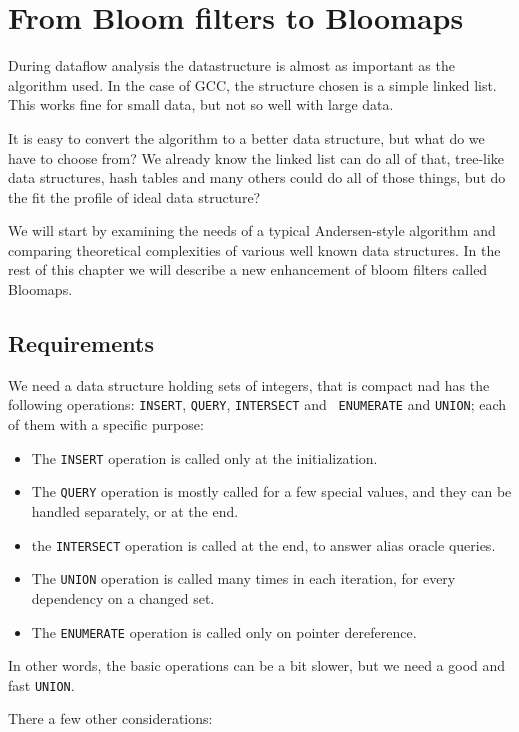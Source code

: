 \chapter{From Bloom filters to Bloomaps}

During dataflow analysis the datastructure is almost as important as the
algorithm used. In the case of GCC, the structure chosen is a simple linked
list. This works fine for small data, but not so well with large data.

It is easy to convert the algorithm to a better data structure, but what do we
have to choose from? We already know the linked list can do all of that,
tree-like data structures, hash tables and many others could do all of those
things, but do the fit the profile of ideal data structure?

We will start by examining the needs of a typical Andersen-style algorithm and
comparing theoretical complexities of various well known data structures. In the
rest of this chapter we will describe a new enhancement of bloom filters called
Bloomaps.

\section{Requirements}

We need a data structure holding sets of integers, that is compact nad has the
following operations: {\tt INSERT}, {\tt QUERY}, {\tt INTERSECT} and {\tt
ENUMERATE} and {\tt UNION}; each of them with a specific purpose:

\begin{itemize}
	\item The {\tt INSERT} operation is called only at the initialization.
	\item The {\tt QUERY} operation is mostly called for a few special values,
		and they can be handled separately, or at the end.
	\item the {\tt INTERSECT} operation is called at the end, to answer alias
		oracle queries.
	\item The {\tt UNION} operation is called many times in each iteration, for
		every dependency on a changed set.
	\item The {\tt ENUMERATE} operation is called only on pointer dereference.
\end{itemize}

In other words, the basic operations can be a bit slower, but we need a good and
fast {\tt UNION}.

There a few other considerations:

